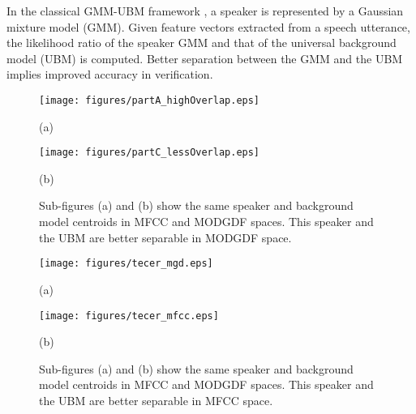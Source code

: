 \documentclass{article}
\begin{document}
In the classical GMM-UBM framework \cite{reynoldsAdaptedGMM}, a speaker is
represented by a Gaussian mixture model (GMM). Given feature vectors extracted
from a speech utterance, the likelihood ratio of the speaker GMM and that of the
universal background model (UBM) is computed. Better separation between the GMM
and the UBM implies improved accuracy in verification.

\begin{figure}[h]
\centering 
\begin{minipage}[c]{0.5\textwidth}
\centering \hspace{-6cm}
    \texttt{[image: figures/partA\_highOverlap.eps]}
	\caption*{(a)}
	\label{fig:GmmMgdOpt}
\end{minipage}%
\begin{minipage}[c]{0.35\textwidth}
\centering  \hspace{-4.5cm}
    \texttt{[image: figures/partC\_lessOverlap.eps]}
	\caption*{(b)}
	\label{fig:GmmMfcOpt}
\end{minipage}
\caption{Sub-figures (a) and (b) show the same speaker and background model centroids in MFCC and MODGDF spaces. This speaker and the UBM are better separable in 
MODGDF space.}
\label{fig:ubm_sep1}
\end{figure}

\begin{figure}[h]
\centering 
\begin{minipage}[c]{0.45\textwidth}
\centering 
    \texttt{[image: figures/tecer\_mgd.eps]}
	\caption*{(a)}
	\label{fig:GmmMgdOpt}
\end{minipage}%
%
\begin{minipage}[c]{0.45\textwidth}
\centering  
    \texttt{[image: figures/tecer\_mfcc.eps]}
	\caption*{(b)}
	\label{fig:GmmMfcOpt}
\end{minipage}
\caption{Sub-figures (a) and (b) show the same speaker and background model centroids in MFCC and MODGDF spaces. This speaker and the UBM are better separable in 
MFCC space.}
\label{fig:ubm_sep2}
\end{figure}
\end{document}
